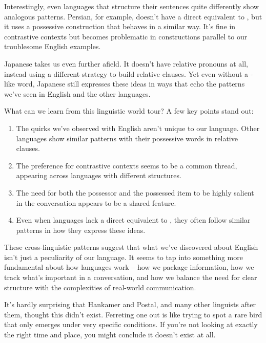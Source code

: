 Interestingly, even languages that structure their sentences quite differently show analogous patterns. Persian, for example, doesn't have a direct equivalent to , but it uses a possessive construction that behaves in a similar way. It's fine in contrastive contexts but becomes problematic in constructions parallel to our troublesome English examples.

Japanese takes us even further afield. It doesn't have relative pronouns at all, instead using a different strategy to build relative clauses. Yet even without a -like word, Japanese still expresses these ideas in ways that echo the patterns we've seen in English and the other languages.

What can we learn from this linguistic world tour? A few key points stand out:

\begin{enumerate}
    \item The quirks we've observed with English  aren't unique to our language. Other languages show similar patterns with their possessive words in relative clauses.

    \item The preference for contrastive contexts seems to be a common thread, appearing across languages with different structures.

    \item The need for both the possessor and the possessed item to be highly salient in the conversation appears to be a shared feature.

    \item Even when languages lack a direct equivalent to , they often follow similar patterns in how they express these ideas.
\end{enumerate}

These cross-linguistic patterns suggest that what we've discovered about English  isn't just a peculiarity of our language. It seems to tap into something more fundamental about how languages work -- how we package information, how we track what's important in a conversation, and how we balance the need for clear structure with the complexities of real-world communication.

\bigskip

It's hardly surprising that Hankamer and Postal, and many other linguists after them, thought this  didn't exist. Ferreting one out is like trying to spot a rare bird that only emerges under very specific conditions. If you're not looking at exactly the right time and place, you might conclude it doesn't exist at all.


